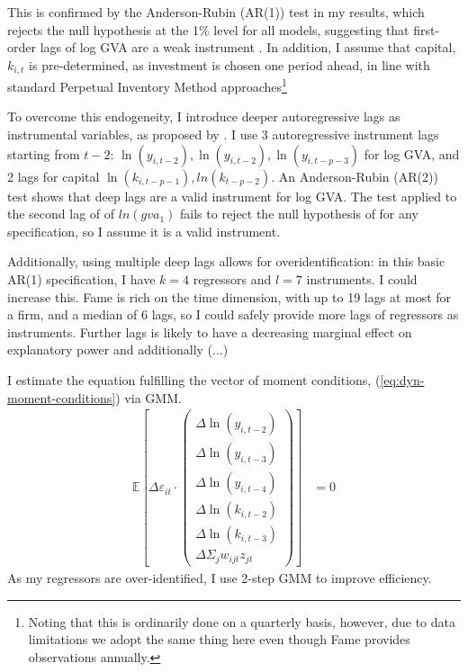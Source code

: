 This is confirmed by the Anderson-Rubin (AR(1)) test in my results,
which rejects the null hypothesis at the 1\% level for all models,
suggesting that first-order lags of log GVA are a weak instrument
.
In addition, I assume that capital, $k_{i,t}$ is pre-determined, as investment is chosen
one period ahead, in line with standard Perpetual Inventory Method approaches\footnote{
    Noting that this is ordinarily done on a quarterly basis,
    however, due to data limitations we adopt the same thing here even though Fame
    provides observations annually.
}
\par
To overcome this endogeneity, I introduce deeper autoregressive lags as instrumental variables,
as proposed by \citep{Anderson1981}.
I use 3 autoregressive instrument lags starting from $t-2$:
$\ln(y_{i,t-2}), \ln(y_{i,t-2}), \ln(y_{i,t-p-3})$ for log GVA,
and 2 lags for capital $\ln(k_{i,t-p-1}), ln(k_{t-p-2})$.
An Anderson-Rubin (AR(2)) test shows that deep lags are a valid instrument for log GVA.
The test applied to the second lag of of $ln(gva_1)$
fails to reject the null hypothesis of for any specification,
so I assume it is a valid instrument.
\par
Additionally, using multiple deep lags allows for overidentification:
in this basic AR(1) specification, I have $k=4$ regressors and $l=7$ instruments.
I could increase this. Fame is rich on the time dimension, with up to 19 lags at most for a firm,
and a median of 6 lags, so I could safely provide more lags of regressors as instruments.
Further lags is likely to have a decreasing marginal effect on explanatory power
and additionally \todo(...)

\par
I estimate the equation fulfilling the vector of moment conditions,
(\ref{eq:dyn-moment-conditions}) via GMM.
\begin{align}
    \label{eq:dyn-moment-conditions}
    \mathbb E \left[
        \Delta\varepsilon_{it}
        \cdot
        \begin{pmatrix}
            \Delta \ln(y_{i,t-2})     \\
            \Delta \ln(y_{i,t-3})     \\
            \Delta \ln(y_{i,t-4})     \\
            \Delta \ln(k_{i,t-2})     \\
            \Delta \ln(k_{i,t-3})     \\
            \Delta \Sigma_jw_{ijt}z_{jt}
        \end{pmatrix}
    \right]
    &= 0
\end{align}
As my regressors are over-identified, I use 2-step GMM to improve efficiency.
 
